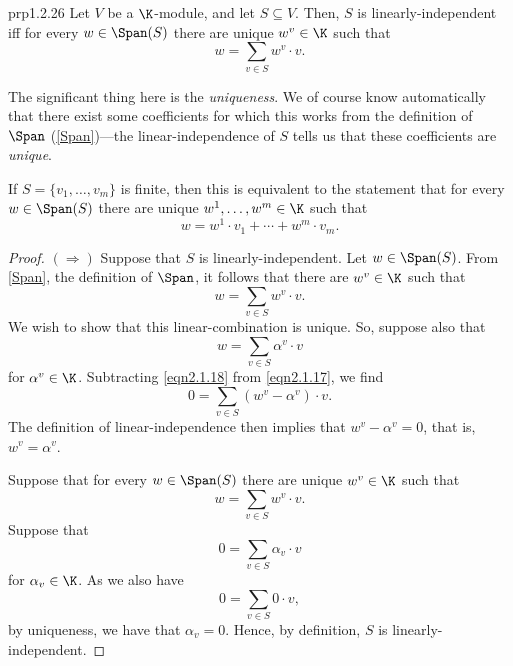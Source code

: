 \begin{prp}{}{prp1.2.26}
	Let $V$ be a $\K$-module, and let $S\subseteq V$.  Then, $S$ is linearly-independent iff for every $w\in \Span (S)$ there are unique $w^v\in \K$ such that
	\begin{equation}
		w=\sum _{v\in S}w^v\cdot v.
	\end{equation}
	\begin{rmk}
		The significant thing here is the \emph{uniqueness}.  We of course know automatically that there exist some coefficients for which this works from the definition of $\Span$ (\cref{Span})---the linear-independence of $S$ tells us that these coefficients are \emph{unique}.
	\end{rmk}
	\begin{rmk}
		If $S=\{ v_1,\ldots ,v_m\}$ is finite, then this is equivalent to the statement that for every $w\in \Span (S)$ there are unique $w^1,\ldots ,w^m\in \K$ such that
		\begin{equation}
			w=w^1\cdot v_1+\cdots +w^m\cdot v_m.
		\end{equation}
	\end{rmk}
	\begin{proof}
		$(\Rightarrow )$ Suppose that $S$ is linearly-independent.  Let $w\in \Span (S)$.  From \cref{Span}, the definition of $\Span$, it follows that there are $w^v\in \K$ such that
		\begin{equation}\label{eqn2.1.17}
			w=\sum _{v\in S}w^v\cdot v.
		\end{equation}
		We wish to show that this linear-combination is unique.  So, suppose also that
		\begin{equation}\label{eqn2.1.18}
			w=\sum _{v\in S}\alpha ^v\cdot v
		\end{equation}
		for $\alpha ^v\in \K$.  Subtracting \eqref{eqn2.1.18} from \eqref{eqn2.1.17}, we find
		\begin{equation}
			0=\sum _{v\in S}(w^v-\alpha ^v)\cdot v.
		\end{equation}
		The definition of linear-independence then implies that $w^v-\alpha ^v=0$, that is, $w^v=\alpha ^v$.
		
		\blni
		Suppose that for every $w\in \Span (S)$ there are unique $w^v\in \K$ such that
		\begin{equation}
		w=\sum _{v\in S}w^v\cdot v.
		\end{equation}
		Suppose that
		\begin{equation}
			0=\sum _{v\in S}\alpha _v\cdot v
		\end{equation}
		for $\alpha _v\in \K$.  As we also have
		\begin{equation}
			0=\sum _{v\in S}0\cdot v,
		\end{equation}
		by uniqueness, we have that $\alpha _v=0$.  Hence, by definition, $S$ is linearly-independent.
	\end{proof}
\end{prp}
